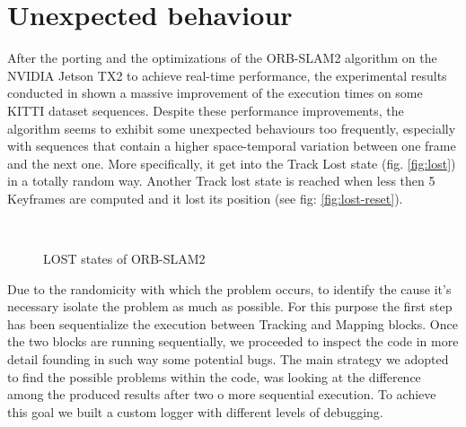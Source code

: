 

\section{Unexpected behaviour}
After the porting and the optimizations of the ORB-SLAM2 algorithm on the NVIDIA Jetson TX2 to achieve real-time performance, the experimental results conducted in \cite{iros2019} shown a massive improvement of the execution times on some KITTI dataset sequences.
Despite these performance improvements, the algorithm seems to exhibit some unexpected behaviours too frequently, especially with sequences that contain a higher space-temporal variation between one frame and the next one. More specifically, it get into the Track Lost state (fig. \ref{fig:lost})  in a totally random way. Another Track lost state is reached when less then 5 Keyframes are computed and it lost its position (see fig: \ref{fig:lost-reset}).

\begin{figure}[t]
	\centering
	\\
	\caption{LOST states of ORB-SLAM2}
\end{figure}

Due to the randomicity with which the problem occurs, to identify the cause it's necessary isolate the problem as much as possible. For this purpose the first step has been sequentialize the execution between Tracking and Mapping blocks.
Once the two blocks are running sequentially, we proceeded to inspect the code in more detail founding in such way some potential bugs.
The main strategy we adopted to find the possible problems within the code, was looking at the difference among the produced results after two o more sequential execution. To achieve this goal we built a custom logger with different levels of debugging.

